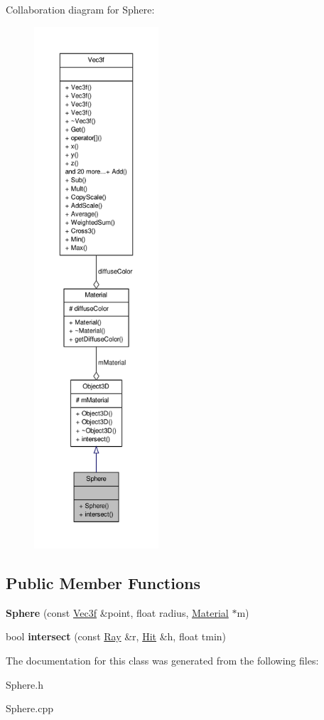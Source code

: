 \-Collaboration diagram for \-Sphere\-:
\nopagebreak
\begin{figure}[H]
\begin{center}
\leavevmode
\includegraphics[height=550pt]{classSphere__coll__graph}
\end{center}
\end{figure}
\subsection*{\-Public \-Member \-Functions}
\begin{DoxyCompactItemize}
\item 
\hypertarget{classSphere_aa165eb2886cd16fd67052a2e8e92f6b2}{{\bfseries \-Sphere} (const \hyperlink{classVec3f}{\-Vec3f} \&point, float radius, \hyperlink{classMaterial}{\-Material} $\ast$m)}\label{classSphere_aa165eb2886cd16fd67052a2e8e92f6b2}

\item 
\hypertarget{classSphere_a87f585d7a2618e8b8974968d4624c92a}{bool {\bfseries intersect} (const \hyperlink{classRay}{\-Ray} \&r, \hyperlink{classHit}{\-Hit} \&h, float tmin)}\label{classSphere_a87f585d7a2618e8b8974968d4624c92a}

\end{DoxyCompactItemize}


\-The documentation for this class was generated from the following files\-:\begin{DoxyCompactItemize}
\item 
\-Sphere.\-h\item 
\-Sphere.\-cpp\end{DoxyCompactItemize}
